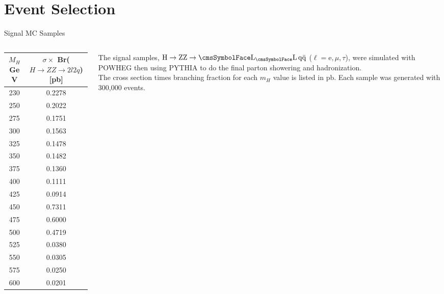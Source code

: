 \section{Event Selection}

\begin{frame}{Signal MC Samples}
\begin{columns}
      \begin{column}{0.5\textwidth}
\begin{center}
\footnotesize
\begin{tabular}{|c|c|}
\hline
$M_H$ GeV & $\sigma\times$ Br($H \rightarrow ZZ \rightarrow 2l2q$) [pb] \\ \hline
 230  &  0.2278  \\ %
 250  &  0.2022 \\ %
 275  &  0.1751  \\ %
 300  &  0.1563  \\ %
 325  &  0.1478  \\ %
 350  &  0.1482  \\         
 375  &  0.1360  \\       
 400  &  0.1111 \\ %
 425  &  0.0914 \\ %
 450  &  0.7311 \\ %
 475  &  0.6000 \\ %
 500  &  0.4719 \\ %
  525  &  0.0380 \\ %
  550  &  0.0305 \\ %
 575  &  0.0250 \\ %
  600  &  0.0201 \\ \hline 
 
\end{tabular}
\end{center}

\end{column}
\begin{column}{0.5\textwidth}
The signal samples, $\Htollqq$ ($\ell = \mathrm{e}, \mu, \tau$), were simulated with POWHEG then using PYTHIA to do the final parton showering and hadronization.
\\
\vspace{1em}
The cross section times branching fraction for each $m_H$ value is listed in pb. Each sample was generated with 300,000 events.
    \end{column}
  \end{columns}
\end{frame}






